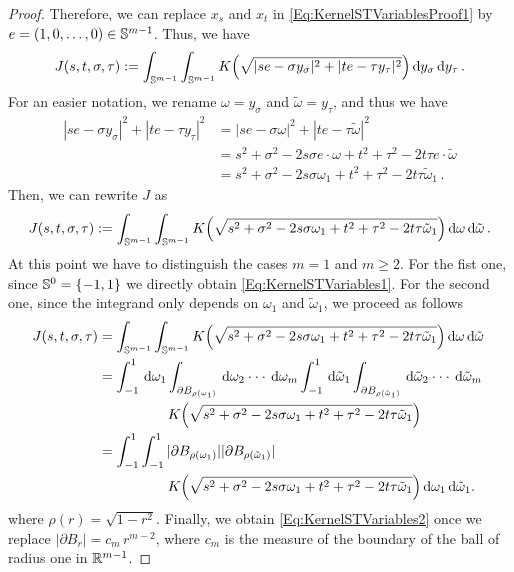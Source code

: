 \begin{proof}
Therefore, we can replace $x_s$ and $x_t$ in \eqref{Eq:KernelSTVariablesProof1} by $e =(1,0,\ldots,0) \in \mathbb{S}^{m-1}$. Thus, we have
\begin{equation*}
J(s,t,\sigma, \tau) := \int_{\mathbb{S}^{m-1}}  \int_{\mathbb{S}^{m-1}} K\Big( \sqrt{|s e - \sigma y_\sigma|^2 + |t e - \tau y_\tau|^2 }\Big) \,\mathrm{d} y_\sigma \,\mathrm{d} y_\tau \,.
\end{equation*}
For an easier notation, we rename $\omega = y_\sigma$ and $\tilde\omega = y_\tau$, and thus we have
\begin{align*}
|s e - \sigma y_\sigma|^2 + |t e - \tau y_\tau|^2 &= |s e - \sigma \omega|^2 + |t e - \tau \tilde\omega|^2\\
&= s^2 +\sigma^2 - 2 s \sigma e \cdot \omega + t^2 + \tau^2 - 2 t \tau e\cdot \tilde\omega \\
&= s^2 +\sigma^2 - 2 s \sigma \omega_1 + t^2 + \tau^2 - 2t \tau\tilde\omega_1\,.
\end{align*}
Then, we can rewrite $J$ as
\begin{equation*}
\label{Eq:KernelSTVariablesProof3}
J(s,t,\sigma, \tau) := \int_{\mathbb{S}^{m-1}}  \int_{\mathbb{S}^{m-1}} K\Big( \sqrt{s^2+\sigma^2- 2 s \sigma \omega_1 + t^2 + \tau^2 - 2t \tau\tilde\omega_1}\Big) \,\mathrm{d} \omega \,\mathrm{d} \tilde\omega \,.
\end{equation*}
At this point we have to distinguish the cases $m=1$ and $m\geq 2$. For the fist one, since
$\mathbb{S}^{0} = \{-1,1\}$ we directly obtain \eqref{Eq:KernelSTVariables1}. For the second one,
since the integrand only depends on $\omega_1$ and $\tilde\omega_1$, we proceed as follows
\begin{align*}
\label{Eq:KernelSTVariablesProof4}
J(s,t,\sigma, \tau) &= \int_{\mathbb{S}^{m-1}}  \int_{\mathbb{S}^{m-1}} K\Big( \sqrt{s^2+\sigma^2- 2 s \sigma \omega_1 + t^2 + \tau^2 - 2t \tau\tilde\omega_1}\Big) \,\mathrm{d} \omega \,\mathrm{d} \tilde\omega \,\\
&= \int_{-1}^1 \,\mathrm{d} \omega_1 \int_{\partial B_{\rho(\omega_1)}} \,\mathrm{d} \omega_2\cdot\cdot\cdot\,\mathrm{d} \omega_m \int_{-1}^1 \,\mathrm{d} \tilde\omega_1 \int_{\partial B_{\rho(\tilde\omega_1)}} \,\mathrm{d} \tilde\omega_2\cdot\cdot\cdot\,\mathrm{d} \tilde\omega_m  \\
& \quad \quad \quad \quad \quad K\Big( \sqrt{s^2+\sigma^2- 2 s \sigma \omega_1 + t^2 + \tau^2 - 2t \tau\tilde\omega_1}\Big) \, \\
&= \int_{-1}^1 \int_{-1}^1  |\partial B_{\rho(\omega_1)}| |\partial B_{\rho(\tilde\omega_1)}|\,\\
& \quad \quad \quad \quad \quad K\Big( \sqrt{s^2+\sigma^2- 2 s \sigma \omega_1 + t^2 + \tau^2 - 2t \tau\tilde\omega_1}\Big) \,\mathrm{d} \omega_1 \,\mathrm{d} \tilde\omega_1.
\end{align*}
where $\rho(r) = \sqrt{1-r^2}$. Finally, we obtain \eqref{Eq:KernelSTVariables2} once we replace
$|\partial B_{r}|=c_m\,r^{m-2}$, where $c_m$ is the measure of the boundary of the ball of radius one in
$\mathbb{R}^{m-1}$.
\end{proof}

